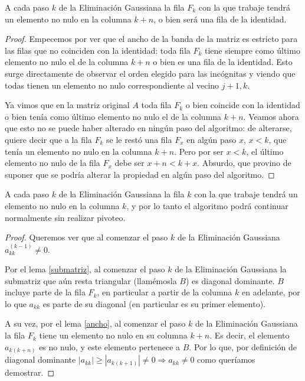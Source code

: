 \begin{lemma}\label{ancho}
 A cada paso $k$ de la Eliminación Gaussiana la fila $F_k$ con la que trabaje tendrá un elemento no nulo en la columna $k+n$, o bien será una fila de la identidad.
\end{lemma}
\begin{proof}
 Empecemos por ver que el ancho de la banda de la matriz es estricto para las filas que no coinciden con la identidad: toda fila $F_k$ tiene siempre como último elemento no nulo el de la columna $k+n$ o bien es una fila de la identidad. Esto surge directamente de observar el orden elegido para las incógnitas y viendo que todas tienen un elemento no nulo correspondiente al vecino $j+1, k$.

 Ya vimos que en la matriz original $A$ toda fila $F_k$ o bien coincide con la identidad o bien tenía como último elemento no nulo el de la columna $k+n$. Veamos ahora que esto no se puede haber alterado en ningún paso del algoritmo: de alterarse, quiere decir que a la fila $F_k$ se le restó una fila $F_x$ en algún paso $x$, $x<k$, que tenía un elemento no nulo en la columna $k+n$. Pero por ser $x<k$, el último elemento no nulo de la fila $F_x$ debe ser $x+n < k+x$. Absurdo, que provino de suponer que se podría alterar la propiedad en algún paso del algoritmo.
\end{proof}

\begin{proposition}\label{pivoteo}
 A cada paso $k$ de la Eliminación Gaussiana la fila $k$ con la que trabaje tendrá un elemento no nulo en la columna $k$, y por lo tanto el algoritmo podrá continuar normalmente sin realizar pivoteo.
\end{proposition}
\begin{proof}
 Queremos ver que al comenzar el paso $k$ de la Eliminación Gaussiana $a_{kk}^{(k-1)} \neq 0$.

 Por el lema \ref{submatriz}, al comenzar el paso $k$ de la Eliminación Gaussiana la submatriz que aún resta triangular (llamémosla $B$) es diagonal dominante. $B$ incluye parte de la fila $F_k$, en particular a partir de la columna $k$ en adelante, por lo que $a_{kk}$ es parte de su diagonal (en particular es su primer elemento).
 
 A su vez, por el lema \ref{ancho}, al comenzar el paso $k$ de la Eliminación Gaussiana la fila $F_k$ tiene un elemento no nulo en su columna $k+n$. Es decir, el elemento $a_{k(k+n)}$ es no nulo, y este elemento pertenece a $B$. Por lo que, por definición de diagonal dominante $|a_{kk}| \geq |a_{k(k+1)}| \neq 0 \Rightarrow a_{kk} \neq 0$ como queríamos demostrar. 
\end{proof}
